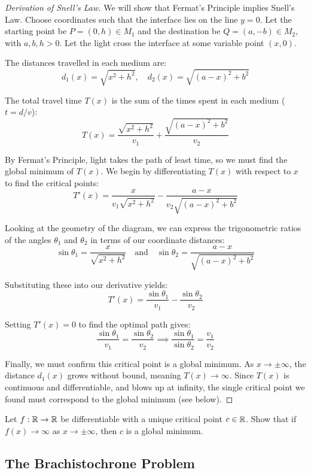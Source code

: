 \documentclass[../analysis1.tex]{subfiles}
\begin{document}
\begin{proof}[Derivation of Snell's Law]
    We will show that Fermat's Principle implies Snell's Law. Choose coordinates such that the interface lies on the line $y=0$. Let the starting point be $P = (0,h) \in M_1$ and the destination be $Q = (a,-b) \in M_2$, with $a,b,h > 0$. Let the light cross the interface at some variable point $(x,0)$.
    
    The distances travelled in each medium are:
    \[ d_1(x) = \sqrt{x^2 + h^2}, \quad d_2(x) = \sqrt{(a-x)^2 + b^2} \]
    
    The total travel time $T(x)$ is the sum of the times spent in each medium ($t = d/v$):
    \[ T(x) = \frac{\sqrt{x^2 + h^2}}{v_1} + \frac{\sqrt{(a-x)^2 + b^2}}{v_2} \]
    
    By Fermat's Principle, light takes the path of least time, so we must find the global minimum of $T(x)$. We begin by differentiating $T(x)$ with respect to $x$ to find the critical points:
    \[ T'(x) = \frac{x}{v_1\sqrt{x^2 + h^2}} - \frac{a-x}{v_2\sqrt{(a-x)^2 + b^2}} \]
    
    Looking at the geometry of the diagram, we can express the trigonometric ratios of the angles $\theta_1$ and $\theta_2$ in terms of our coordinate distances:
    \[ \sin \theta_1 = \frac{x}{\sqrt{x^2 + h^2}} \quad \text{and} \quad \sin \theta_2 = \frac{a-x}{\sqrt{(a-x)^2 + b^2}} \]
    
    Substituting these into our derivative yields:
    \[ T'(x) = \frac{\sin \theta_1}{v_1} - \frac{\sin \theta_2}{v_2} \]
    
    Setting $T'(x) = 0$ to find the optimal path gives:
    \[ \frac{\sin \theta_1}{v_1} = \frac{\sin \theta_2}{v_2} \implies \frac{\sin \theta_1}{\sin \theta_2} = \frac{v_1}{v_2} \]
    
    Finally, we must confirm this critical point is a global minimum. As $x \to \pm\infty$, the distance $d_1(x)$ grows without bound, meaning $T(x) \to \infty$. Since $T(x)$ is continuous and differentiable, and blows up at infinity, the single critical point we found must correspond to the global minimum (see below). 
\end{proof}

\begin{exercise*}
    Let $f:\mathbb{R}\to\mathbb{R}$ be differentiable with a unique critical point $c\in \mathbb{R}$. Show that if $f(x)\to \infty$ as $x\to \pm \infty$, then $c$ is a global minimum.
\end{exercise*}

\subsection{The Brachistochrone Problem}
\end{document}
